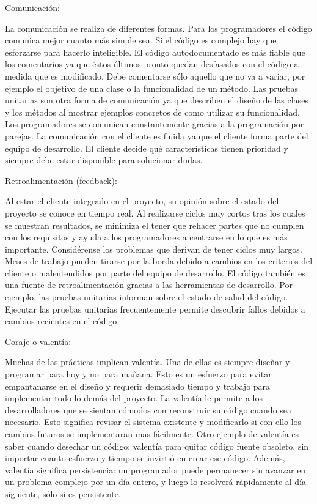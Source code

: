 \documentclass[12 pt, a4paper, twoside]{article}
\begin{document}
    Comunicación:

La comunicación se realiza de diferentes formas. Para los programadores el código comunica mejor cuanto más simple sea. Si el código es complejo hay que esforzarse para hacerlo inteligible. El código autodocumentado es más fiable que los comentarios ya que éstos últimos pronto quedan desfasados con el código a medida que es modificado. Debe comentarse sólo aquello que no va a variar, por ejemplo el objetivo de una clase o la funcionalidad de un método. Las pruebas unitarias son otra forma de comunicación ya que describen el diseño de las clases y los métodos al mostrar ejemplos concretos de como utilizar su funcionalidad. Los programadores se comunican constantemente gracias a la programación por parejas. La comunicación con el cliente es fluida ya que el cliente forma parte del equipo de desarrollo. El cliente decide qué características tienen prioridad y siempre debe estar disponible para solucionar dudas.

    Retroalimentación (feedback):

Al estar el cliente integrado en el proyecto, su opinión sobre el estado del proyecto se conoce en tiempo real. Al realizarse ciclos muy cortos tras los cuales se muestran resultados, se minimiza el tener que rehacer partes que no cumplen con los requisitos y ayuda a los programadores a centrarse en lo que es más importante. Considérense los problemas que derivan de tener ciclos muy largos. Meses de trabajo pueden tirarse por la borda debido a cambios en los criterios del cliente o malentendidos por parte del equipo de desarrollo. El código también es una fuente de retroalimentación gracias a las herramientas de desarrollo. Por ejemplo, las pruebas unitarias informan sobre el estado de salud del código. Ejecutar las pruebas unitarias frecuentemente permite descubrir fallos debidos a cambios recientes en el código.

    Coraje o valentía:

Muchas de las prácticas implican valentía. Una de ellas es siempre diseñar y programar para hoy y no para mañana. Esto es un esfuerzo para evitar empantanarse en el diseño y requerir demasiado tiempo y trabajo para implementar todo lo demás del proyecto. La valentía le permite a los desarrolladores que se sientan cómodos con reconstruir su código cuando sea necesario. Esto significa revisar el sistema existente y modificarlo si con ello los cambios futuros se implementaran mas fácilmente. Otro ejemplo de valentía es saber cuando desechar un código: valentía para quitar código fuente obsoleto, sin importar cuanto esfuerzo y tiempo se invirtió en crear ese código. Además, valentía significa persistencia: un programador puede permanecer sin avanzar en un problema complejo por un día entero, y luego lo resolverá rápidamente al día siguiente, sólo si es persistente.
\end{document}
